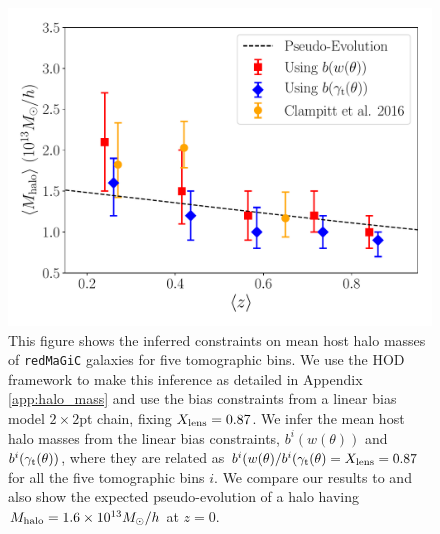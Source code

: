 \documentclass[aps, prd,twocolumn,superscriptaddress,nofootinbib,preprintnumbers]{revtex4-1}
\newcommand{\redmagic}{\texttt{redMaGiC} }
\newcommand{\SP}[1]{{\color{orange}[SP: #1]}}
\newcommand{\blue}[1]{\textcolor{blue}{#1}}
\begin{document}
\begin{figure}
\includegraphics[width=\columnwidth]{figs/M_const.pdf}
\caption[]{
This figure shows the inferred constraints on mean host halo masses of \redmagic galaxies for five tomographic bins. We use the HOD framework to make this inference as detailed in Appendix \ref{app:halo_mass} and use the bias constraints from a linear bias model $2\times2$pt chain, fixing $X_{\rm lens} = 0.87$. We infer the mean host halo masses from the linear bias constraints, $b^{i}(w(\theta))$ and $b^{i}(\gamma_{\rm t}(\theta))$, where they are related as $b^{i}(w(\theta)/b^{i}(\gamma_{\rm t}(\theta) = X_{\rm lens} = 0.87$ for all the five tomographic bins $i$. We compare our results to \citet{Clampitt_2016} and also show the expected pseudo-evolution of a halo having $M_{\rm halo} = 1.6\times 10^{13} M_{\odot}/h$ at $z=0$. 
}
\label{fig:bias_mass_nbar}
\end{figure}
\end{document}
